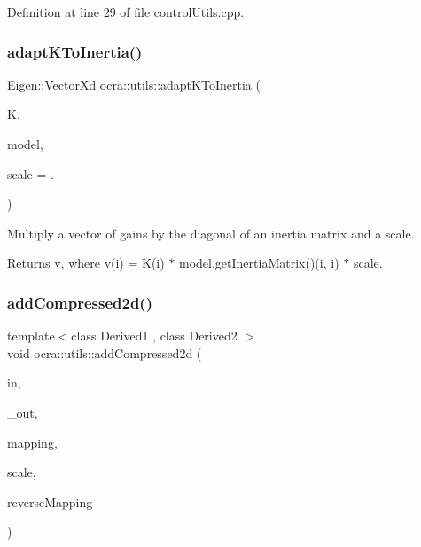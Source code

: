 Definition at line 29 of file control\+Utils.\+cpp.

\hypertarget{namespaceocra_1_1utils_ad8e0359ef8aba5d4f7de70014e9ab324}{}\label{namespaceocra_1_1utils_ad8e0359ef8aba5d4f7de70014e9ab324} 
\subsubsection{\texorpdfstring{adapt\+K\+To\+Inertia()}{adaptKToInertia()}\hspace{0.1cm}{\footnotesize\ttfamily [2/2]}}
{\footnotesize\ttfamily Eigen\+::\+Vector\+Xd ocra\+::utils\+::adapt\+K\+To\+Inertia (\begin{DoxyParamCaption}\item[{const Eigen\+::\+Vector\+Xd \&}]{K,  }\item[{const Model \&}]{model,  }\item[{double}]{scale = {.} }\end{DoxyParamCaption})}

Multiply a vector of gains by the diagonal of an inertia matrix and a scale. \begin{DoxyReturn}{Returns}
v, where v(i) = K(i) $\ast$ model.\+get\+Inertia\+Matrix()(i, i) $\ast$ scale. 
\end{DoxyReturn}
\hypertarget{namespaceocra_1_1utils_ad4dfd96e7620a1cadabe53db0cdf969d}{}\label{namespaceocra_1_1utils_ad4dfd96e7620a1cadabe53db0cdf969d} 
\subsubsection{\texorpdfstring{add\+Compressed2d()}{addCompressed2d()}\hspace{0.1cm}{\footnotesize\ttfamily [1/2]}}
{\footnotesize\ttfamily template$<$class Derived1 , class Derived2 $>$ \\
void ocra\+::utils\+::add\+Compressed2d (\begin{DoxyParamCaption}\item[{const Matrix\+Base$<$ Derived1 $>$ \&}]{in,  }\item[{Matrix\+Base$<$ Derived2 $>$ const \&}]{\+\_\+out,  }\item[{const std\+::vector$<$ int $>$ \&}]{mapping,  }\item[{double}]{scale,  }\item[{bool}]{reverse\+Mapping }\end{DoxyParamCaption})\hspace{0.3cm}{\ttfamily [inline]}}



